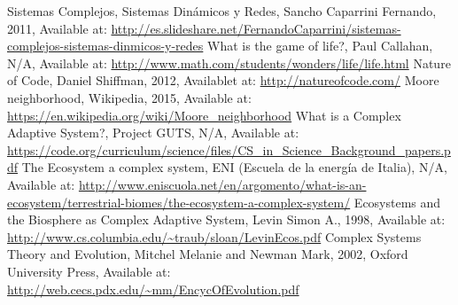 \begin{thebibliography}{1}
    Sistemas Complejos, Sistemas Dinámicos y Redes, Sancho Caparrini Fernando, 2011, Available at: \url{http://es.slideshare.net/FernandoCaparrini/sistemas-complejos-sistemas-dinmicos-y-redes}
    What is the game of life?, Paul Callahan, N/A, Available at: \url{http://www.math.com/students/wonders/life/life.html}
    Nature of Code, Daniel Shiffman, 2012, Availablet at: \url{http://natureofcode.com/}
    Moore neighborhood, Wikipedia, 2015, Available at: \url{https://en.wikipedia.org/wiki/Moore_neighborhood}
    What is a Complex Adaptive System?, Project GUTS, N/A, Available at: \url{https://code.org/curriculum/science/files/CS_in_Science_Background_papers.pdf}
    The Ecosystem\: a complex system, ENI (Escuela de la energía de Italia), N/A, Available at: \url{http://www.eniscuola.net/en/argomento/what-is-an-ecosystem/terrestrial-biomes/the-ecosystem-a-complex-system/}
    Ecosystems and the Biosphere as Complex Adaptive System, Levin Simon A., 1998, Available at: \url{http://www.cs.columbia.edu/~traub/sloan/LevinEcos.pdf}
    Complex Systems Theory and Evolution, Mitchel Melanie and Newman Mark, 2002, Oxford University Press, Available at: \url{http://web.cecs.pdx.edu/~mm/EncycOfEvolution.pdf}
\end{thebibliography}

